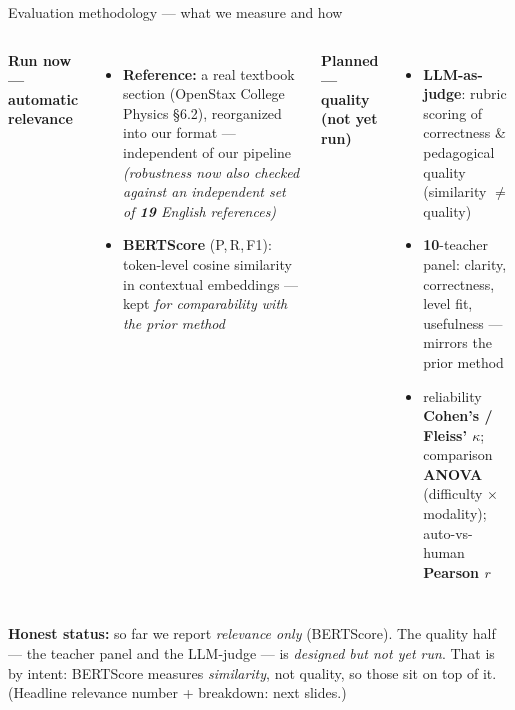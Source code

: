 \documentclass[aspectratio=169,10pt]{beamer}
\newcommand{\hl}[1]{{\bfseries\color{cAccent}#1}}
\begin{document}
\begin{frame}{Evaluation methodology --- what we measure and how}
\small
\begin{columns}[T]
\textbf{\color{cMeas}Run now --- automatic relevance}
\begin{itemize}\setlength\itemsep{1pt}
  \item \textbf{Reference:} a real textbook section (OpenStax College Physics \S6.2), reorganized into our format --- independent of our pipeline \emph{(robustness now also checked against an independent set of \hl{19} English references)}
  \item \textbf{BERTScore} (P,\,R,\,F1): token-level cosine similarity in contextual embeddings --- kept \emph{for comparability with the prior method}
\end{itemize}
\textbf{\color{cAccent}Planned --- quality (not yet run)}
\begin{itemize}\setlength\itemsep{1pt}
  \item \textbf{LLM-as-judge}: rubric scoring of correctness \& pedagogical quality (similarity $\ne$ quality)
  \item \hl{10}-teacher panel: clarity, correctness, level fit, usefulness --- mirrors the prior method
  \item reliability \textbf{Cohen's / Fleiss' $\kappa$}; comparison \textbf{ANOVA} (difficulty $\times$ modality); auto-vs-human \textbf{Pearson $r$}
\end{itemize}
\end{columns}
\vspace{0.4em}
{\scriptsize \textbf{Honest status:} so far we report \emph{relevance only} (BERTScore). The quality half --- the teacher panel and the LLM-judge --- is \emph{designed but not yet run}. That is by intent: BERTScore measures \emph{similarity}, not quality, so those sit on top of it. (Headline relevance number + breakdown: next slides.)}
\end{frame}
\end{document}
